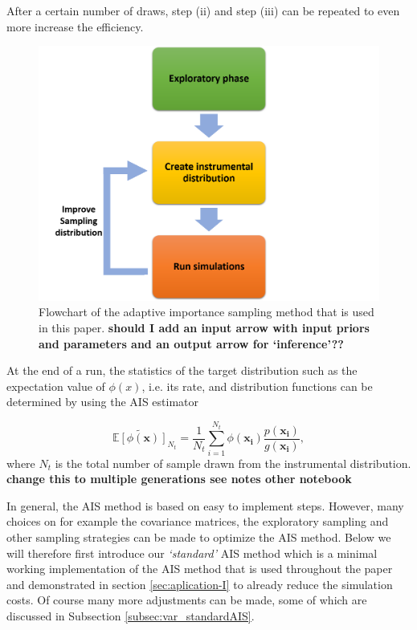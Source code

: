 \documentclass[a4paper,fleqn,usenatbib]{mnras}
\begin{document}
After a certain number of draws, step (ii) and step (iii) can be repeated to even more increase the efficiency. 
%
\begin{figure}
	\includegraphics[width=\columnwidth]{flowchartAISv2.png}
    \caption{Flowchart of the adaptive importance sampling method that is used in this paper.  \textbf{should I add an input arrow with input priors and parameters and an output arrow for `inference'??}}
    \label{fig:aIS_scheme}
\end{figure}
%

At the end of a run, the statistics of the target distribution such as the expectation value of $\phi(x)$, i.e. its rate,  and  distribution functions can be determined by using the AIS estimator

\begin{equation}
	\widetilde{\mathbb{E}[\phi(\mathbf{x})]}_{N_t} = \frac{1}{N_t} \sum_{i=1}^{N_t} \phi(\mathbf{x_i}) \frac{p(\mathbf{x_i})}{g(\mathbf{x_i})}, 
	\label{eq:ISestimator}
\end{equation}
where $N_t$ is the total number of sample drawn from the instrumental distribution. \textbf{change this to multiple generations see notes other notebook}

In general, the AIS method is based on easy to implement steps. However, many choices on for example the covariance matrices, the exploratory sampling and other sampling strategies can be made to optimize the AIS method. Below we will therefore first introduce our \emph{`standard'} AIS method which is a minimal working implementation of the AIS method that is used throughout the paper and demonstrated in section \ref{sec:aplication-I} to already reduce the simulation costs. Of course many more adjustments can be made, some of which are discussed in Subsection \ref{subsec:var_standardAIS}.     
\end{document}
